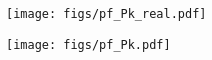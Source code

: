 \begin{figure}
\begin{center}
    \texttt{[image: figs/pf\_Pk\_real.pdf]} 
    \caption{}
\label{fig:pk_real}
\end{center}
\end{figure}

\begin{figure}
\begin{center}
    \texttt{[image: figs/pf\_Pk.pdf]} 
    \caption{}
\label{fig:pk_rsd}
\end{center}
\end{figure}
